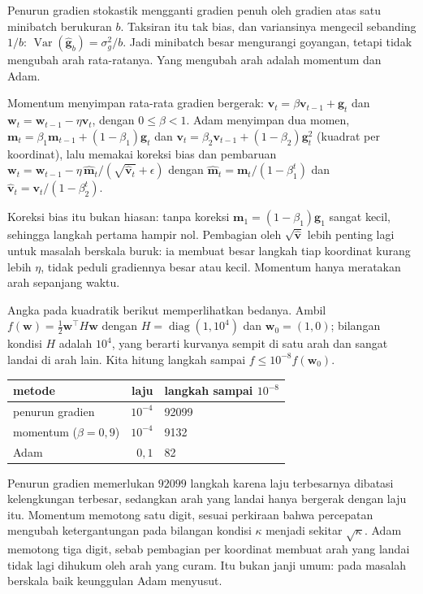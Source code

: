 Penurun gradien stokastik mengganti gradien penuh oleh gradien atas satu minibatch
berukuran $b$. Taksiran itu tak bias, dan variansinya mengecil sebanding $1/b$:
$\operatorname{Var}(\hat{\mathbf{g}}_b)=\sigma_g^2/b$. Jadi minibatch besar mengurangi
goyangan, tetapi tidak mengubah arah rata-ratanya. Yang mengubah arah adalah momentum
dan Adam.

\begin{definisi}
Momentum menyimpan rata-rata gradien bergerak:
$\mathbf{v}_t=\beta\mathbf{v}_{t-1}+\mathbf{g}_t$ dan
$\mathbf{w}_t=\mathbf{w}_{t-1}-\eta\mathbf{v}_t$, dengan $0\le\beta<1$. Adam menyimpan
dua momen, $\mathbf{m}_t=\beta_1\mathbf{m}_{t-1}+(1-\beta_1)\mathbf{g}_t$ dan
$\mathbf{v}_t=\beta_2\mathbf{v}_{t-1}+(1-\beta_2)\mathbf{g}_t^2$ (kuadrat per
koordinat), lalu memakai koreksi bias dan pembaruan
$\mathbf{w}_t=\mathbf{w}_{t-1}-\eta\,\hat{\mathbf{m}}_t/(\sqrt{\hat{\mathbf{v}}_t}+\epsilon)$
dengan $\hat{\mathbf{m}}_t=\mathbf{m}_t/(1-\beta_1^t)$ dan
$\hat{\mathbf{v}}_t=\mathbf{v}_t/(1-\beta_2^t)$.
\end{definisi}

Koreksi bias itu bukan hiasan: tanpa koreksi $\mathbf{m}_1=(1-\beta_1)\mathbf{g}_1$
sangat kecil, sehingga langkah pertama hampir nol. Pembagian oleh $\sqrt{\hat{\mathbf{v}}}$
lebih penting lagi untuk masalah berskala buruk: ia membuat besar langkah tiap koordinat
kurang lebih $\eta$, tidak peduli gradiennya besar atau kecil. Momentum hanya meratakan
arah sepanjang waktu.

Angka pada kuadratik berikut memperlihatkan bedanya. Ambil
$f(\mathbf{w})=\frac12\mathbf{w}^{\top}H\mathbf{w}$ dengan $H=\operatorname{diag}(1,10^4)$
dan $\mathbf{w}_0=(1,0)$; bilangan kondisi $H$ adalah $10^4$, yang berarti kurvanya
sempit di satu arah dan sangat landai di arah lain. Kita hitung langkah sampai
$f\le10^{-8}f(\mathbf{w}_0)$.

\begin{center}
\small
\begin{tabular}{lrl}
\hline
metode & laju & langkah sampai $10^{-8}$ \\
\hline
penurun gradien & $10^{-4}$ & 92099 \\
momentum ($\beta=0{,}9$) & $10^{-4}$ & 9132 \\
Adam & $0{,}1$ & 82 \\
\hline
\end{tabular}
\end{center}

Penurun gradien memerlukan $92099$ langkah karena laju terbesarnya dibatasi kelengkungan
terbesar, sedangkan arah yang landai hanya bergerak dengan laju itu. Momentum memotong
satu digit, sesuai perkiraan bahwa percepatan mengubah ketergantungan pada bilangan
kondisi $\kappa$ menjadi sekitar $\sqrt\kappa$. Adam memotong tiga digit, sebab pembagian
per koordinat membuat arah yang landai tidak lagi dihukum oleh arah yang curam. Itu bukan
janji umum: pada masalah berskala baik keunggulan Adam menyusut.

